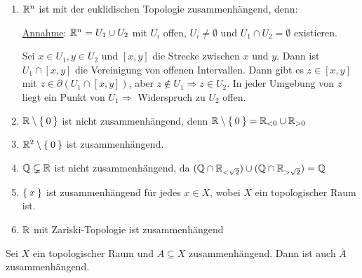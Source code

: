 \begin{beispiel}
    \begin{enumerate}[label=\arabic*)]
        \item $\mathbb{R}^n$ ist mit der euklidischen Topologie zusammenhängend,
            denn:

            \underline{Annahme}: $\mathbb{R}^n = U_1 \cup U_2$ mit $U_i$ 
            offen, $U_i \neq \emptyset$ und $U_1 \cap U_2 = \emptyset$ 
            existieren.

            Sei $x \in U_1, y \in U_2$ und $[x,y]$ die Strecke zwischen $x$
            und $y$. Dann ist $U_1 \cap [x,y]$ die Vereinigung von offenen
            Intervallen. Dann gibt es $z \in [x,y]$ mit $z \in \partial (U_1 \cap [x,y])$,
            aber $z \notin U_1 \Rightarrow z \in U_2$. In jeder Umgebung von 
            $z$ liegt ein Punkt von $U_1 \Rightarrow$ Widerspruch zu $U_2$ offen.
        \item $\mathbb{R} \setminus \Set{0}$ ist nicht zusammenhängend, denn
              $\mathbb{R} \setminus \Set{0} = \mathbb{R}_{< 0} \cup \mathbb{R}_{> 0}$
        \item $\mathbb{R}^2 \setminus \Set{0}$ ist zusammenhängend.
        \item $\mathbb{Q} \subsetneq \mathbb{R}$ ist nicht zusammenhängend, da 
              $(\mathbb{Q} \cap \mathbb{R}_{< \sqrt{2}}) \cup (\mathbb{Q} \cap \mathbb{R}_{> \sqrt{2}}) = \mathbb{Q}$
        \item $\Set{x}$ ist zusammenhängend für jedes $x \in X$, 
              wobei $X$ ein topologischer Raum ist.
        \item $\mathbb{R}$ mit Zariski-Topologie ist zusammenhängend
    \end{enumerate}
\end{beispiel}

\begin{korollar}\label{zusammenhangAbschluss}
    Sei $X$ ein topologischer Raum und $A \subseteq X$ zusammenhängend.
    Dann ist auch $\overline{A}$ zusammenhängend.
\end{korollar}

